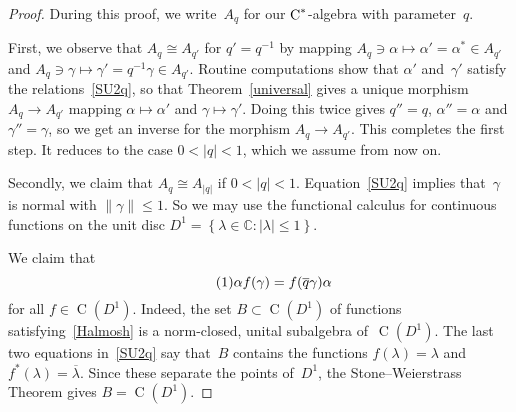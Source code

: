 \documentclass[a4paper]{amsart}
\numberwithin{equation}{section}
\theoremstyle{definition}
\theoremstyle{remark}
\begin{document}
\begin{proof}
  During this proof, we write~\({{A}}_q\) for our
  \({\textup{C}^*}\){\nobreakdash}-algebra with parameter~\(q\).

  First, we observe that \({{A}}_q \cong {{A}}_{q'}\) for \(q'=
  q^{-1}\) by mapping \({{A}}_q\ni \alpha\mapsto \alpha'=
  \alpha^*\in {{A}}_{q'}\) and \({{A}}_q\ni \gamma\mapsto
  \gamma' = q^{-1} \gamma \in {{A}}_{q'}\).  Routine computations
  show that \(\alpha'\) and~\(\gamma'\) satisfy the
  relations~\eqref{SU2q}, so that Theorem~\ref{universal} gives a
  unique morphism \({{A}}_q\to{{A}}_{q'}\) mapping
  \(\alpha\mapsto\alpha'\) and \(\gamma\mapsto\gamma'\).  Doing this
  twice gives \(q''=q\), \(\alpha''=\alpha\) and \(\gamma''=\gamma\),
  so we get an inverse for the morphism
  \({{A}}_q\to{{A}}_{q'}\).  This completes the first step.  It
  reduces to the case \(0<{\left|{q}\right|}<1\), which we assume from now on.

  Secondly, we claim that \({{A}}_q \cong {{A}}_{{\left|{q}\right|}}\) if
  \(0<{\left|{q}\right|}<1\).  Equation~\eqref{SU2q} implies that~$\gamma$ is
  normal with \(\lVert\gamma\rVert \le 1\).  So we may use the
  functional calculus for continuous functions on the unit disc
  $D^{1}={\left\{{\lambda\in{{\mathbb C}}}:{{\left|{\lambda}\right|}\leq 1}\right\}}$.

  We claim that
  \[
  {\label{{Halmosh}}\stepcounter{equation}\tag{\theequation}}
  \alpha f(\gamma)=f({\overline{q}}\gamma)\alpha
  \]
  for all $f\in\operatorname{C}(D^{1})$.  Indeed, the set $B\subset \operatorname{C}(D^1)$ of
  functions satisfying~\eqref{Halmosh} is a norm-closed, unital
  subalgebra of~$\operatorname{C}(D^{1})$.  The last two equations in~\eqref{SU2q}
  say that~$B$ contains the functions $f(\lambda)=\lambda$ and
  $f^*(\lambda)={\overline{\lambda}}$.  Since these separate the points
  of~$D^{1}$, the Stone--Weierstrass Theorem gives $B=\operatorname{C}(D^{1})$.


\end{proof}
\end{document}

